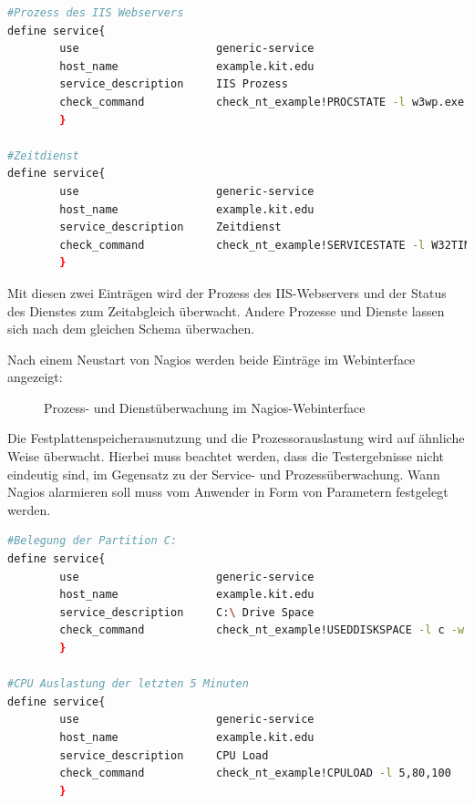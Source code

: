 \begin{lstlisting}[captionpos=b, caption=Prozess- und Service-Check Servicedefintionen, label=procservdef, breaklines = true, language=sh]
#Prozess des IIS Webservers
define service{
        use                     generic-service
        host_name               example.kit.edu
        service_description     IIS Prozess
        check_command           check_nt_example!PROCSTATE -l w3wp.exe
        }

#Zeitdienst
define service{
        use                     generic-service
        host_name               example.kit.edu
        service_description     Zeitdienst
        check_command           check_nt_example!SERVICESTATE -l W32TIME
        }
\end{lstlisting}

Mit diesen zwei Einträgen wird der Prozess des \gls{IIS}-Webservers und der Status des Dienstes zum Zeitabgleich überwacht.
Andere Prozesse und Dienste lassen sich nach dem gleichen Schema überwachen.

Nach einem Neustart von Nagios werden beide Einträge im Webinterface angezeigt:

\begin{figure}[ht]
	\centering
		\caption{Prozess- und Dienstüberwachung im Nagios-Webinterface}
		\label{servprocgui}
\end{figure}

Die Festplattenspeicherausnutzung und die Prozessorauslastung wird auf ähnliche Weise überwacht.
Hierbei muss beachtet werden, dass die Testergebnisse nicht eindeutig sind, im Gegensatz zu der Service- und Prozessüberwachung.
Wann Nagios alarmieren soll muss vom Anwender in Form von Parametern festgelegt werden.

\begin{lstlisting}[captionpos=b, caption=Überwachung der Festplatten- und Prozessorauslastung, label=cpuhdddef, breaklines = true, language=sh]
#Belegung der Partition C:
define service{
        use                     generic-service
        host_name               example.kit.edu
        service_description     C:\ Drive Space
        check_command           check_nt_example!USEDDISKSPACE -l c -w 85 -c 100
        }
        
#CPU Auslastung der letzten 5 Minuten
define service{
        use                     generic-service
        host_name               example.kit.edu
        service_description     CPU Load
        check_command           check_nt_example!CPULOAD -l 5,80,100
        }
\end{lstlisting}

